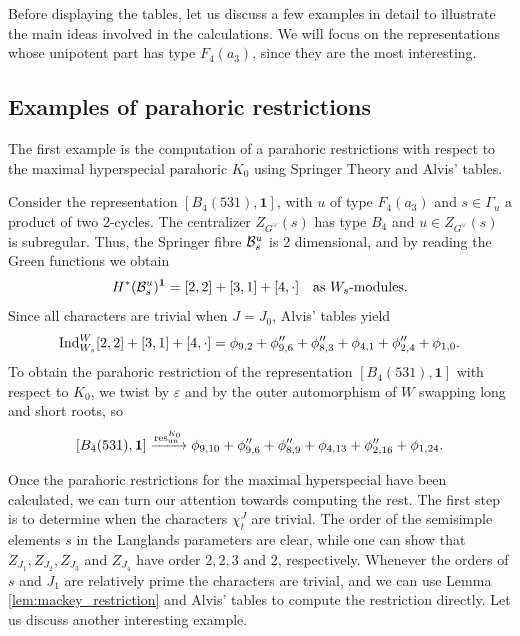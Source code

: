 Before displaying the tables, let us discuss a few examples in detail to illustrate the main ideas involved in the calculations. We will focus on the representations whose unipotent part has type $F_4(a_3)$, since they are the most interesting. 

\subsection{Examples of parahoric restrictions}
The first example is the computation of a parahoric restrictions with respect to the maximal hyperspecial parahoric $K_0$ using Springer Theory and Alvis' tables.

\begin{example}
    Consider the representation $[B_4(531),\mathbf{1}]$, with $u$ of type $F_4(a_3)$ and $s\in\Gamma_u$ a product of two $2$-cycles. The centralizer $Z_{G^\vee}(s)$ has type $B_4$ and $u\in Z_{G^\vee}(s)$ is subregular. Thus, the Springer fibre $\mathcal{B}^u_s$ is $2$ dimensional, and by reading the Green functions we obtain
    $$H^*(\mathcal{B}^u_s)^\mathbf{1}=[2,2]+[3,1]+[4,\cdot]\quad\text{as $W_s$-modules}.$$
    Since all characters are trivial when $J=J_0$, Alvis' tables yield
    $$\mathrm{Ind}_{W_s}^W[2,2]+[3,1]+[4,\cdot]=\phi_{9,2}+\phi_{9,6}''+\phi_{8,3}''+\phi_{4,1}+\phi_{2,4}''+\phi_{1,0}.$$
    To obtain the parahoric restriction of the representation $[B_4(531),\mathbf{1}]$ with respect to $K_0$, we twist by $\varepsilon$ and by the outer automorphism of $W$ swapping long and short roots, so
    $$[B_4(531),\mathbf{1}]\xrightarrow{\mathrm{res}^{K_0}_{\mathrm{un}}}\phi_{9,10}+\phi_{9,6}''+\phi_{8,9}''+\phi_{4,13}+\phi_{2,16}''+\phi_{1,24}.$$
\end{example}
Once the parahoric restrictions for the maximal hyperspecial have been calculated, we can turn our attention towards computing the rest. The first step is to determine when the characters $\chi_t^J$ are trivial. The order of the semisimple elements $s$ in the Langlands parameters are clear, while one can show that $Z_{J_1},Z_{J_2},Z_{J_3}$ and $Z_{J_4}$ have order $2,2,3$ and $2$, respectively. Whenever the orders of $s$ and $J_1$ are relatively prime the characters are trivial, and we can use Lemma \ref{lem:mackey_restriction} and Alvis' tables to compute the restriction directly. Let us discuss another interesting example.

